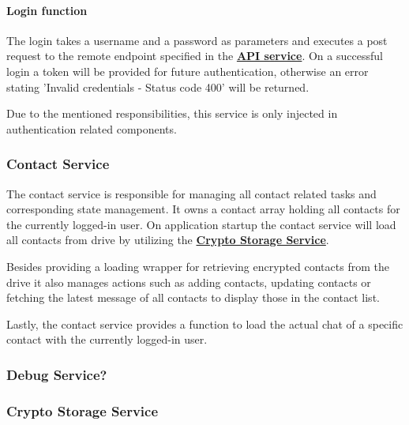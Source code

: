 \paragraph{Login function}
The login takes a username and a password as parameters and executes a post request to the remote endpoint specified in
the \textbf{\hyperref[subsubsec:api-service]{API service}}.
On a successful login a token will be provided for future authentication, otherwise an error stating 'Invalid
credentials - Status code 400' will be returned.


Due to the mentioned responsibilities, this service is only injected in authentication related components.

\subsubsection{Contact Service}\label{subsubsec:contact-service}

The contact service is responsible for managing all contact related tasks and corresponding state management.
It owns a contact array holding all contacts for the currently logged-in user.
On application startup the contact service will load all contacts from drive by utilizing the
\textbf{\hyperref[subsubsec:crypto-storage-service]{Crypto Storage Service}}.

Besides providing a loading wrapper for retrieving encrypted contacts from the drive it also manages actions such as
adding contacts, updating contacts or fetching the latest message of all contacts to display those in the contact list.

Lastly, the contact service provides a function to load the actual chat of a specific contact with the currently
logged-in user.


\subsubsection{Debug Service?}

\subsubsection{Crypto Storage Service}

